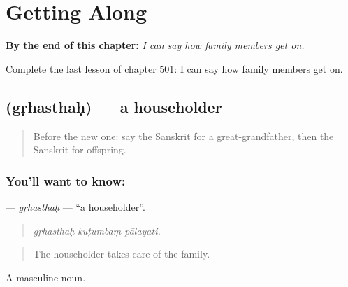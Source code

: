 
\chapter{Getting Along}
\label{ch:sa-getting-along}

\begin{chapteropening}
\textbf{By the end of this chapter:} \emph{I can say how family members get on.}

Complete the last lesson of chapter 501: I can say how family members get on.
\end{chapteropening}

\section[\texorpdfstring{\sk{गृहस्थः} (gṛhasthaḥ)}{गृहस्थः (gṛhasthaḥ)}]{ (gṛhasthaḥ) — a householder}

\label{lesson:SA-C501-grhasthah}



\begin{quote}
Before the new one: say the Sanskrit for a great-grandfather, then the Sanskrit for offspring.
\end{quote}

\subsection*{You'll want to know: }
\textbf{} — \emph{gṛhasthaḥ} — \textquotedblleft{}a householder\textquotedblright{}.

\begin{quote}
  
\end{quote}

\begin{quote}
\emph{gṛhasthaḥ kuṭumbaṃ pālayati.}
\end{quote}

\begin{quote}
The householder takes care of the family.
\end{quote}

A masculine noun.

